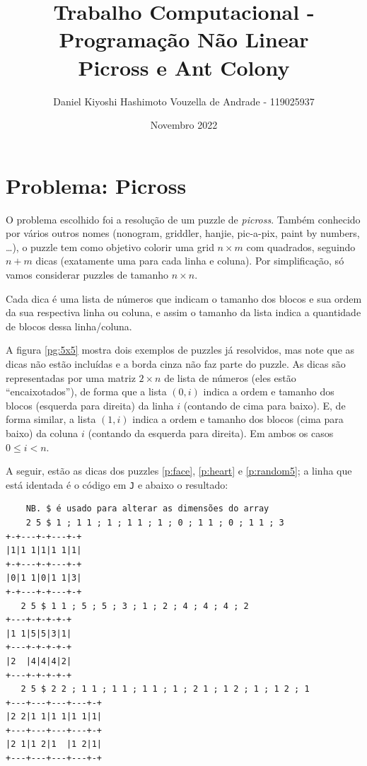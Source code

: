 \documentclass{article}
\title{Trabalho Computacional - Programação Não Linear\\
Picross e Ant Colony}
\author{Daniel Kiyoshi Hashimoto Vouzella de Andrade - 119025937}
\date{Novembro 2022}
\newcommand{\lang}{\texttt{J}}
\begin{document}
\maketitle

\section{Problema: Picross}

O problema escolhido foi a resolução de
um puzzle de \emph{picross}.
Também conhecido por vários outros nomes
(nonogram, griddler, hanjie, pic-a-pix,
paint by numbers, \dots),
o puzzle tem como objetivo colorir
uma grid \(n \times m\) com quadrados,
seguindo \(n + m\) dicas
(exatamente uma para cada linha e coluna).
Por simplificação, só vamos considerar
puzzles de tamanho \(n \times n\).

Cada dica é uma lista de números
que indicam o tamanho dos blocos e
sua ordem da sua respectiva linha ou coluna,
e assim o tamanho da lista
indica a quantidade de blocos dessa linha/coluna.

A figura \ref{pg:5x5} mostra dois exemplos
de puzzles já resolvidos,
mas note que as dicas não estão incluídas e
a borda cinza não faz parte do puzzle.
As dicas são representadas por uma matriz
\(2 \times n\) de lista de números
(eles estão ``encaixotados''),
de forma que a lista \((0,i)\)
indica a ordem e tamanho dos blocos
(esquerda para direita)
da linha \(i\)
(contando de cima para baixo).
E, de forma similar,
a lista \((1,i)\)
indica a ordem e tamanho dos blocos
(cima para baixo)
da coluna \(i\)
(contando da esquerda para direita).
Em ambos os casos \(0 \le i < n\).

A seguir, estão as dicas dos puzzles
\ref{p:face}, \ref{p:heart} e \ref{p:random5};
a linha que está identada é o código em \lang{}
e abaixo o resultado:
\begin{verbatim}
    NB. $ é usado para alterar as dimensões do array
    2 5 $ 1 ; 1 1 ; 1 ; 1 1 ; 1 ; 0 ; 1 1 ; 0 ; 1 1 ; 3
+-+---+-+---+-+
|1|1 1|1|1 1|1|
+-+---+-+---+-+
|0|1 1|0|1 1|3|
+-+---+-+---+-+
   2 5 $ 1 1 ; 5 ; 5 ; 3 ; 1 ; 2 ; 4 ; 4 ; 4 ; 2
+---+-+-+-+-+
|1 1|5|5|3|1|
+---+-+-+-+-+
|2  |4|4|4|2|
+---+-+-+-+-+
   2 5 $ 2 2 ; 1 1 ; 1 1 ; 1 1 ; 1 ; 2 1 ; 1 2 ; 1 ; 1 2 ; 1
+---+---+---+---+-+
|2 2|1 1|1 1|1 1|1|
+---+---+---+---+-+
|2 1|1 2|1  |1 2|1|
+---+---+---+---+-+
\end{verbatim}
\end{document}
